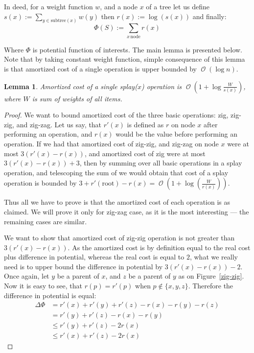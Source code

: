 \documentclass[11pt]{article}
\DeclareMathOperator*{\Oh}{\mathcal{O}}
\newtheorem{lemma}[theorem]{Lemma}
\begin{document}
In deed, for a weight function $w$, and a node $x$ of a tree let us define $s(x) := \sum_{y \in \mathrm{subtree}(x)} w(y)$ then $r(x) := \log(s(x))$ and finally:
\begin{equation*}
\Phi(S) := \sum_{x \, \mathrm{node}} r(x)
\end{equation*}

Where $\Phi$ is potential function of interests. The main lemma is presented below. Note that by taking constant weight function, simple consequence of this lemma is that amortized cost of a single operation is upper bounded by $\Oh(\log n)$.
\begin{lemma}
Amortized cost of a  single splay($x$) operation is $\Oh(1 + \log\frac{W}{s(x)})$, where $W$ is sum of weights of all items.
\end{lemma}
\begin{proof}
We want to bound amortized cost of the three basic operations: zig, zig-zig, and zig-zag. Let us say, that $r'(x)$ is defined as $r$ on node $x$ after performing an operation, and $r(x)$ would be the value before performing an operation. If we had that amortized cost of zig-zig, and zig-zag on node $x$ were at most $3(r'(x) - r(x))$, and amortized cost of zig were at most $3 (r'(x) - r(x)) + 3$, then by summing over all basic operations in a splay operation, and telescoping the sum of we would obtain that cost of a splay operation is bounded by $3 + r'(\mathrm{root}) - r(x) = \Oh(1 + \log(\frac{W}{r(x)}))$.

Thus all we have to prove is that the amortized cost of each operation is as claimed. We will prove it only for zig-zag case, as it is the most interesting --- the remaining cases are similar.

We want to show that amortized cost of zig-zig operation is not greater than $3(r'(x) - r(x))$. As the amortized cost is by definition equal to the real cost plus difference in potential, whereas the real cost is equal to $2$, what we really need is to upper bound the difference in potential by $3(r'(x) - r(x)) - 2$. Once again, let $y$ be a parent of $x$, and $z$ be a parent of $y$ as on Figure~\ref{zig-zig}. Now it is easy to see, that $r(p) = r'(p)$ when $p \not\in \{x,y,z\}$. Therefore the difference in potential is equal:
\begin{align*}
\Delta\Phi & = r'(x) + r'(y) + r'(z) - r(x) - r(y) - r(z) \\
	& = r'(y) + r'(z) - r(x) - r(y) \\
	& \leq r'(y) + r'(z) - 2r(x) \\
	& \leq r'(x) + r'(z) - 2r(x)
\end{align*}


\end{proof}
\end{document}
